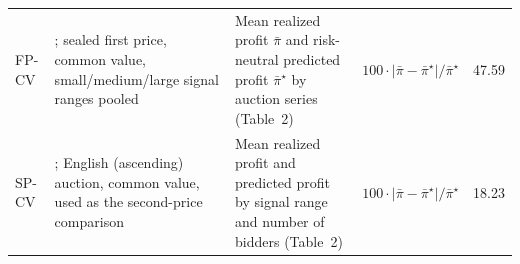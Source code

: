 \begin{table}[tbp]
\begin{tabular}{@{}p{}p{}p{}p{}r@{}}
    FP-CV & \citet{kagel1986winner}; sealed first price, common value, small/medium/large signal ranges pooled & Mean realized profit $\bar\pi$ and risk-neutral predicted profit $\bar\pi^\star$ by auction series (Table~2) & $100\cdot|\bar\pi-\bar\pi^\star|/\bar\pi^\star$ & 47.59 \\
    SP-CV & \citet{levin1996revenue}; English (ascending) auction, common value, used as the second-price comparison & Mean realized profit and predicted profit by signal range and number of bidders (Table~2) & $100\cdot|\bar\pi-\bar\pi^\star|/\bar\pi^\star$ & 18.23 \\
    \bottomrule
  \end{tabular}
\end{table}
